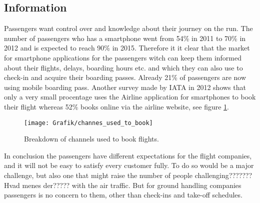 \subsection{Information}
Passengers want control over and knowledge about their journey on the run. The number of passengers who has a smartphone went from 54\% in 2011 to 70\% in 2012 and is expected to reach 90\% in 2015. Therefore it it clear that the market for smartphone applications for the passengers witch can keep them informed about their flights, delays, boarding hours etc. and which they can also use to check-in and acquire their boarding passes. Already 21\% of passengers are now using mobile boarding pass.
Another survey made by IATA in 2012 shows that only a very small procentage uses the Airline application for smartphones to book their flight whereas 52\% books online via the airline website, see figure \ref{channes used to book}.

\begin{figure}
\centering
\texttt{[image: Grafik/channes\_used\_to\_book]}
\caption{Breakdown of channels used to book flights.}
\label{channes used to book}
\end{figure}


In conclusion the passengers have different expectations for the flight companies, and it will not be easy to satisfy every customer fully. To do so would be a major challenge, but also one that might raise the number of people challenging???????Hvad menes der????? with the air traffic. But for ground handling companies passengers is no concern to them, other than check-ins and take-off schedules.


